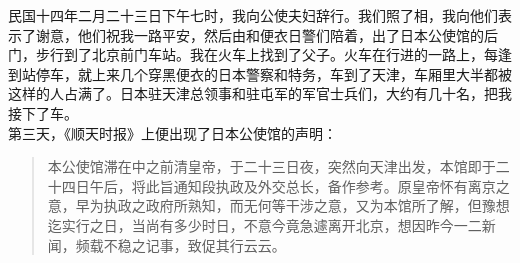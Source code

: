 民国十四年二月二十三日下午七时，我向公使夫妇辞行。我们照了相，我向他们表示了谢意，他们祝我一路平安，然后由和便衣日警们陪着，出了日本公使馆的后门，步行到了北京前门车站。我在火车上找到了父子。火车在行进的一路上，每逢到站停车，就上来几个穿黑便衣的日本警察和特务，车到了天津，车厢里大半都被这样的人占满了。日本驻天津总领事和驻屯军的军官士兵们，大约有几十名，把我接下了车。\\

第三天，《顺天时报》上便出现了日本公使馆的声明：\\

\begin{quote}
	本公使馆滞在中之前清皇帝，于二十三日夜，突然向天津出发，本馆即于二十四日午后，将此旨通知段执政及外交总长，备作参考。原皇帝怀有离京之意，早为执政之政府所熟知，而无何等干涉之意，又为本馆所了解，但豫想迄实行之日，当尚有多少时日，不意今竟急遽离开北京，想因昨今一二新闻，频载不稳之记事，致促其行云云。
\end{quote}
